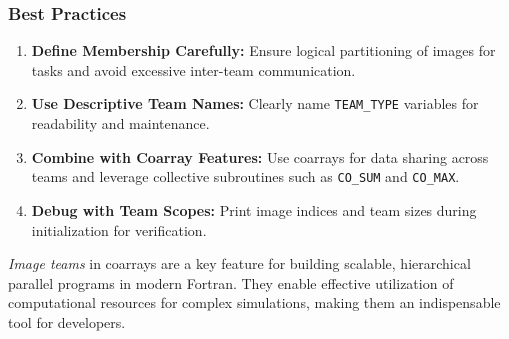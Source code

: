 \subsubsection{Best Practices}

\begin{enumerate}
    \item \textbf{Define Membership Carefully:} Ensure logical partitioning of images for tasks and avoid excessive inter-team communication.
    \item \textbf{Use Descriptive Team Names:} Clearly name \lstinline{TEAM_TYPE} variables for readability and maintenance.
    \item \textbf{Combine with Coarray Features:} Use coarrays for data sharing across teams and leverage collective subroutines such as \lstinline{CO_SUM} and \lstinline{CO_MAX}.
    \item \textbf{Debug with Team Scopes:} Print image indices and team sizes during initialization for verification.
\end{enumerate}

\emph{Image teams} in coarrays are a key feature for building scalable, hierarchical parallel programs in modern Fortran. They enable effective utilization of computational resources for complex simulations, making them an indispensable tool for developers.

\endinput  %
